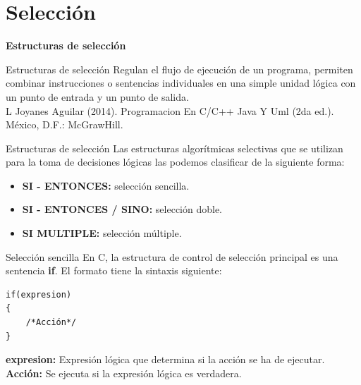 \section{Selección}

\begin{frame}[c] 
\centering
\huge \textbf{Estructuras de selección}
\end{frame}


\begin{frame}[c]{Estructuras de selección}
	Regulan el flujo de ejecución de un programa, permiten combinar instrucciones o sentencias individuales en una simple unidad lógica con un punto de entrada y un punto de salida.\\
    \vspace*{30mm}
    \tiny L Joyanes Aguilar (2014). Programacion En C/C++ Java Y Uml (2da ed.). México, D.F.: McGrawHill.
\end{frame}


\begin{frame}[c]{Estructuras de selección}
Las estructuras algorítmicas selectivas que se utilizan para la toma de decisiones lógicas las podemos clasificar de la siguiente forma:
\begin{itemize}
    \item \textbf{SI - ENTONCES:} selección sencilla.
    \item \textbf{SI - ENTONCES / SINO:} selección doble.
    \item \textbf{SI MULTIPLE:} selección múltiple.
\end{itemize}
\end{frame}

\begin{frame}[fragile]{Selección sencilla}
En C, la estructura de control de selección principal es una sentencia \textbf{if}. 
El formato tiene la sintaxis siguiente:
\begin{lstlisting}
if(expresion)
{
    /*Acción*/
}
\end{lstlisting}
\textbf{expresion:} Expresión lógica que determina si la acción se ha de ejecutar.\\
\textbf{Acción:} Se ejecuta si la expresión lógica es verdadera.
\end{frame}

